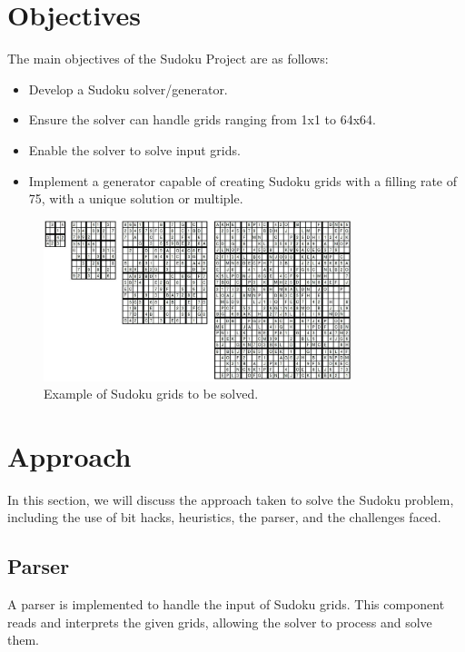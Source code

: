 \documentclass[a4paper, 11pt]{article}
\begin{document}
\newpage

\tableofcontents

\newpage

\vspace{3\baselineskip}
\section{Objectives}
The main objectives of the Sudoku Project are as follows:
\begin{itemize}
    \item Develop a Sudoku solver/generator.
    \item Ensure the solver can handle grids ranging from 1x1 to 64x64.
    \item Enable the solver to solve input grids.
    \item Implement a generator capable of creating Sudoku grids with a filling rate of 75, with a unique solution or multiple.
\end{itemize}

\begin{figure}[h]
  \centering
  \includegraphics[width=0.8\textwidth]{grilles.png}
  \caption{Example of Sudoku grids to be solved.}
\end{figure}

\section{Approach}
In this section, we will discuss the approach taken to solve the Sudoku problem, including the use of bit hacks, heuristics, the parser, and the challenges faced.

\subsection{Parser}
A parser is implemented to handle the input of Sudoku grids. This component reads and interprets the given grids, allowing the solver to process and solve them.
\end{document}
